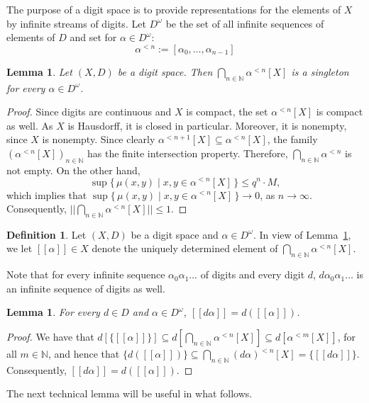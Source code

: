 \documentclass[microtype]{jloganal}
\theoremstyle{plain}
\newtheorem{lemma}[theorem]{Lemma}
\theoremstyle{definition}
\newtheorem{definition}[theorem]{Definition}
\newcommand{\NN}{\mathbb{N}}
\newcommand{\val}[1]{[\![#1]\!]}
\begin{document}
The purpose of a digit space is to provide representations for the
elements of $X$ by infinite streams of digits. 
Let $D^\omega$ be the set of all infinite sequences of elements of $D$ 
and set for  $\alpha \in D^\omega$:
$$\alpha^{<n} := [\alpha_0,\ldots,\alpha_{n-1}]$$ 
\begin{lemma}
\label{lem-digit-stream}
Let $(X,D)$ be a digit space. Then
$\bigcap_{n \in \NN} \alpha^{< n}[X]$
is a singleton for every $\alpha \in D^\omega$. 
\end{lemma}
\begin{proof}
Since digits are continuous and $X$ is compact, the set $\alpha^{<n}[X]$ 
is compact as well. As $X$ is Hausdorff, it is closed in particular. 
Moreover, it is nonempty, since $X$ is nonempty. 
Since clearly $\alpha^{< n+1}[X] \subseteq \alpha^{< n}[X]$,
the family $(\alpha^{< n}[X])_{n \in \NN}$ has the finite 
intersection property. 
Therefore, $\bigcap_{n \in \NN} \alpha^{< n}$ is not empty. 
On the other hand, 
\[
\sup \{\, \mu(x,y) \mid x, y \in \alpha^{< n}[X] \,\} \le q^n \cdot M,
\]
which implies that 
$\sup \{\, \mu(x,y) \mid x, y \in \alpha^{< n}[X] \,\} \rightarrow 0$, 
as $n \rightarrow \infty$. 
Consequently, $||\bigcap_{n \in \NN} \alpha^{< n}[X] || \le 1$. 
\end{proof}
\begin{definition}
\label{def-digit-stream-value}
Let $(X,D)$ be a digit space and $\alpha \in D^\omega$.
In view of Lemma~\ref{lem-digit-stream}, we let $\val{\alpha}\in X$ 
denote the uniquely determined element of 
$\bigcap_{n \in \NN} \alpha^{< n}[X]$.
\end{definition}

Note that for every infinite sequence $\alpha_0\alpha_1\ldots$ of digits and every digit $d$, $d\alpha_0\alpha_1\ldots$ is an infinite sequence of digits as well.

\begin{lemma}\label{lem-valrec}
For every $d \in D$ and $\alpha \in D^\omega$, $\val{d\alpha} = d(\val{\alpha})$.
\end{lemma}
\begin{proof}
We have that $d[\{\val{\alpha}\}]  \subseteq d[\bigcap_{n\in\NN} \alpha^{<n}[X]] \subseteq d[\alpha^{<m}[X]]$, for all $m \in \NN$, and hence that $\{d(\val{\alpha})\} \subseteq \bigcap_{n\in\NN}(d\alpha)^{<n}[X] =\{\val{d\alpha}\}$. Consequently, $\val{d\alpha} = d(\val{\alpha})$.
\end{proof}

The next technical lemma will be useful in what follows.
\end{document}
